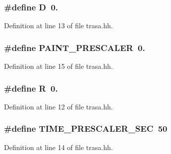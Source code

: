 \subsubsection[{\texorpdfstring{D}{D}}]{\setlength{\rightskip}{0pt plus 5cm}\#define D~0.}\hypertarget{trasa_8hh_af316c33cc298530f245e8b55330e86b5}{}\label{trasa_8hh_af316c33cc298530f245e8b55330e86b5}


Definition at line 13 of file trasa.\+hh.

\subsubsection[{\texorpdfstring{P\+A\+I\+N\+T\+\_\+\+P\+R\+E\+S\+C\+A\+L\+ER}{PAINT_PRESCALER}}]{\setlength{\rightskip}{0pt plus 5cm}\#define P\+A\+I\+N\+T\+\_\+\+P\+R\+E\+S\+C\+A\+L\+ER~0.}\hypertarget{trasa_8hh_a54aee68ea5d21c1ff7999b13f3fb58e2}{}\label{trasa_8hh_a54aee68ea5d21c1ff7999b13f3fb58e2}


Definition at line 15 of file trasa.\+hh.

\subsubsection[{\texorpdfstring{R}{R}}]{\setlength{\rightskip}{0pt plus 5cm}\#define R~0.}\hypertarget{trasa_8hh_a5c71a5e59a53413cd6c270266d63b031}{}\label{trasa_8hh_a5c71a5e59a53413cd6c270266d63b031}


Definition at line 12 of file trasa.\+hh.

\subsubsection[{\texorpdfstring{T\+I\+M\+E\+\_\+\+P\+R\+E\+S\+C\+A\+L\+E\+R\+\_\+\+S\+EC}{TIME_PRESCALER_SEC}}]{\setlength{\rightskip}{0pt plus 5cm}\#define T\+I\+M\+E\+\_\+\+P\+R\+E\+S\+C\+A\+L\+E\+R\+\_\+\+S\+EC~50}\hypertarget{trasa_8hh_a84f58a271e6d602a7f75debc82eb7951}{}\label{trasa_8hh_a84f58a271e6d602a7f75debc82eb7951}


Definition at line 14 of file trasa.\+hh.

